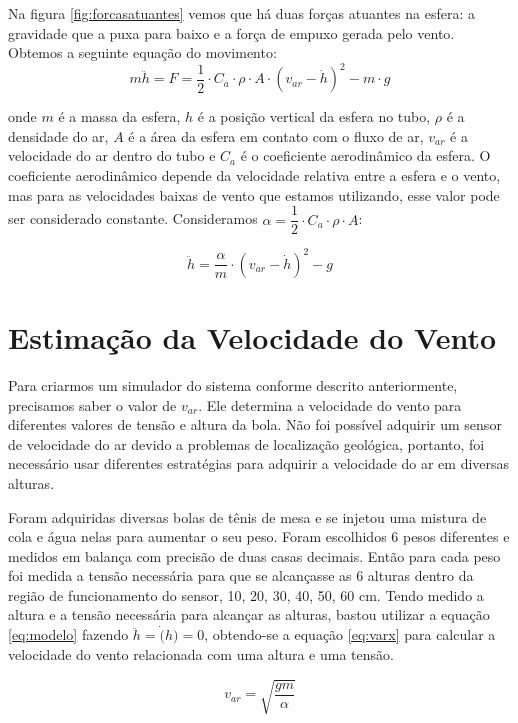 Na figura \ref{fig:forcasatuantes} vemos que há duas forças atuantes na esfera: a gravidade que a puxa para baixo e a força de empuxo gerada pelo vento. Obtemos a seguinte equação do movimento:
\begin{equation}
m \ddot{h}=F=\dfrac{1}{2} \cdot C_a \cdot\rho \cdot A \cdot (v_{ar}- \dot{h})^2-m\cdot g
\end{equation}

onde $m$ é a massa da esfera, $h$ é a posição vertical da esfera no tubo, $\rho$ é a densidade do ar, $A$ é a área da esfera em contato com o fluxo de ar, $v_{ar}$ é a velocidade do ar dentro do tubo e $C_a$ é o coeficiente aerodinâmico da esfera. O coeficiente aerodinâmico depende da velocidade relativa entre a esfera e o vento, mas para as velocidades baixas de vento que estamos utilizando, esse valor pode ser considerado constante. Consideramos $\alpha= \dfrac{1}{2} \cdot C_a \cdot \rho \cdot A$:


\begin{equation} \label{eq:modelo}
\ddot{h}=\dfrac{\alpha}{m}\cdot (v_{ar}-\dot{h})^2-g
\end{equation}

\section{Estimação da Velocidade do Vento}

Para criarmos um simulador do sistema conforme descrito anteriormente, precisamos saber o valor de $v_{ar}$. Ele determina a velocidade do vento para diferentes valores de tensão e altura da bola. Não foi possível adquirir um sensor de velocidade do ar devido a problemas de localização geológica, portanto, foi necessário usar diferentes estratégias para adquirir a velocidade do ar em diversas alturas.


Foram adquiridas diversas bolas de tênis de mesa e se injetou uma mistura de cola e água nelas para aumentar o seu peso. Foram escolhidos 6 pesos diferentes e medidos em balança com precisão de duas casas decimais. Então para cada peso foi medida a tensão necessária para que se alcançasse as 6 alturas dentro da região de funcionamento do sensor, 10, 20, 30, 40, 50, 60 cm. Tendo medido a altura e a tensão necessária para alcançar as alturas, bastou utilizar a equação \eqref{eq:modelo} fazendo $\ddot{h}=\dot(h)=0$, obtendo-se a equação \ref{eq:varx} para calcular a velocidade do vento relacionada com uma altura e uma tensão.

\begin{equation}\label{eq:varx}
v_{ar}=\sqrt{\dfrac{gm}{\alpha}}
\end{equation}

